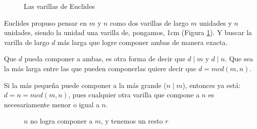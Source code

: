 \documentclass[12pt, a4paper, openany, fleqn]{book}
\begin{document}
    \begin{figure}[h]
        \centering
        \caption{Las varillas de Euclides} \label{varillas_euclides}
    \end{figure}

    Euclides propuso pensar en $m$ y $n$ como dos varillas de largo $m$ unidades y $n$ unidades, siendo la unidad una varilla de, pongamos, 1cm (Figura \ref{varillas_euclides}).
    Y buscar la varilla de largo $d$ más larga que logre componer ambas de manera exacta.

    Que $d$ pueda componer a ambas, es otra forma de decir que $d \mid m$ y $d \mid n$. Que sea la más larga entre las que pueden componerlas quiere decir que $d = mcd(m,n)$.

    Si la más pequeña puede componer a la más grande ($n \mid m$), entonces ya está: $d=n=mcd(m,n)$, pues cualquier otra varilla que compone a $n$ es necesariamente menor o igual a $n$.

    \begin{figure}[h]
        \centering
        \caption{$n$ no logra componer a $m$, y tenemos un resto $r$} \label{varillas_euclides_resto}
    \end{figure}
\end{document}
